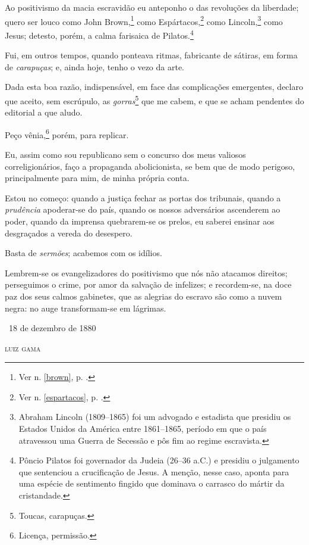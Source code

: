 {Ao positivismo da macia escravidão eu anteponho o das revoluções da
liberdade; quero ser louco como John
Brown,\footnote{Ver n. \ref{brown}, p. \pageref{brown}.} como
Espártacos,\footnote{Ver n. \ref{espartacos}, p. \pageref{espartacos}.} como Lincoln,\footnote{Abraham Lincoln (1809--1865) foi
  um advogado e estadista que presidiu os Estados Unidos da América
  entre 1861--1865, período em que o país atravessou uma Guerra de
  Secessão e pôs fim ao regime escravista.} como Jesus; detesto, porém,
a calma farisaica de Pilatos.\footnote{Pôncio Pilatos foi governador
  da Judeia (26--36 a.C.) e presidiu o julgamento que sentenciou a
  crucificação de Jesus. A menção, nesse caso, aponta para uma espécie
  de sentimento fingido que dominava o carrasco do mártir da
  cristandade.}

Fui, em outros tempos, quando ponteava ritmas, fabricante de sátiras, em
forma de \emph{carapuças}; e, ainda hoje, tenho o vezo da arte.

Dada esta boa razão, indispensável, em face das complicações emergentes,
declaro que aceito, sem escrúpulo, as \emph{gorras}\footnote{Toucas,
  carapuças.} que me cabem, e que se acham pendentes do editorial a que
aludo.

Peço vênia,\footnote{Licença, permissão.} porém, para replicar.

Eu, assim como sou republicano sem o concurso dos meus valiosos
correligionários, faço a propaganda abolicionista, se bem que de modo
perigoso, principalmente para mim, de minha própria conta.

Estou no começo: quando a justiça fechar as portas dos tribunais, quando
a \emph{prudência} apoderar-se do país, quando os nossos adversários
ascenderem ao poder, quando da imprensa quebrarem-se os prelos, eu
saberei ensinar aos desgraçados a vereda do desespero.

Basta de \emph{sermões}; acabemos com os idílios.

Lembrem-se os evangelizadores do positivismo que nós não atacamos
direitos; perseguimos o crime, por amor da salvação de infelizes; e
recordem-se, na doce paz dos seus calmos gabinetes, que as alegrias do
escravo são como a nuvem negra: no auge transformam-se em lágrimas.

\medskip

\hfill\ 18 de dezembro de 1880

\hfill\textsc{luiz gama}

}
